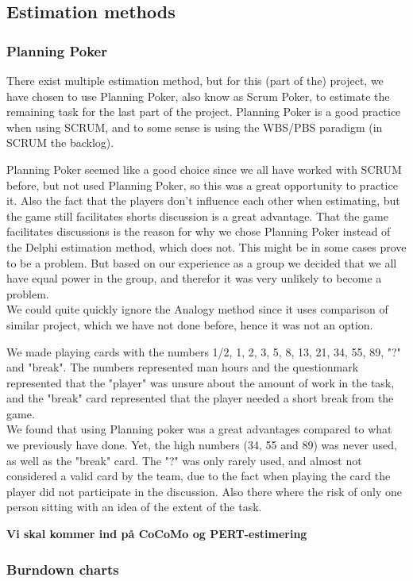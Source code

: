 \subsection{Estimation methods}
\subsubsection{Planning Poker}
There exist multiple estimation method, but for this (part of the) project, we have chosen to use Planning Poker, also know as Scrum Poker, to estimate the remaining task for the last part of the project. Planning Poker is a good practice when using SCRUM, and to some sense is using the WBS/PBS paradigm (in SCRUM the backlog).

Planning Poker seemed like a good choice since we all have worked with SCRUM before, but not used Planning Poker, so this was a great opportunity to practice it. Also the fact that the players don't influence each other when estimating, but the game still facilitates shorts discussion is a great advantage. That the game facilitates discussions is the reason for why we chose Planning Poker instead of the Delphi estimation method, which does not. This might be in some cases prove to be a problem. But based on our experience as a group we decided that we all have equal power in the group, and therefor it was very unlikely to become a problem. \\
We could quite quickly ignore the Analogy method since it uses comparison of similar project, which we have not done before, hence it was not an option.

We made playing cards with the numbers 1/2, 1, 2, 3, 5, 8, 13, 21, 34, 55, 89, "?" and "break". The numbers represented man hours and the questionmark represented that the "player" was unsure about the amount of work in the task, and the "break" card represented that the player needed a short break from the game.\\
We found that using Planning poker was a great advantages compared to what we previously have done. Yet, the high numbers (34, 55 and 89) was never used, as well as the "break" card. The "?" was only rarely used, and almost not considered a valid card by the team, due to the fact when playing the card the player did not participate in the discussion. Also there where the risk of only one person sitting with an idea of the extent of the task.

\textbf{Vi skal kommer ind på CoCoMo og PERT-estimering}

\subsubsection{Burndown charts}
